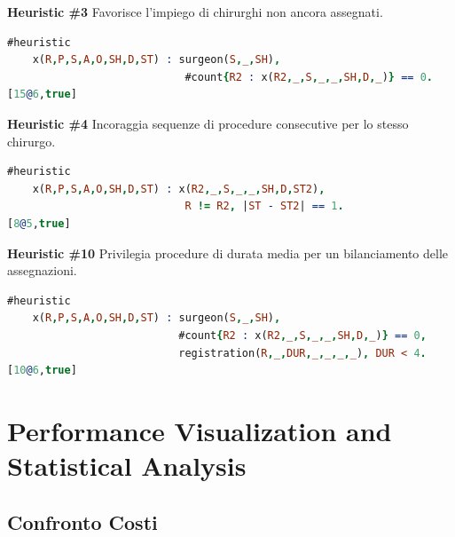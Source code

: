 \documentclass[11pt,a4paper]{article}
\begin{document}
\textbf{Heuristic \#3}
Favorisce l'impiego di chirurghi non ancora assegnati.
\begin{lstlisting}[language=Prolog]
#heuristic 
    x(R,P,S,A,O,SH,D,ST) : surgeon(S,_,SH), 
                            #count{R2 : x(R2,_,S,_,_,SH,D,_)} == 0. 
[15@6,true]
\end{lstlisting}




\textbf{Heuristic \#4}
Incoraggia sequenze di procedure consecutive per lo stesso chirurgo.
\begin{lstlisting}[language=Prolog]
#heuristic 
    x(R,P,S,A,O,SH,D,ST) : x(R2,_,S,_,_,SH,D,ST2), 
                            R != R2, |ST - ST2| == 1. 
[8@5,true]
\end{lstlisting}




\textbf{Heuristic \#10}
Privilegia procedure di durata media per un bilanciamento delle assegnazioni.
\begin{lstlisting}[language=Prolog]
#heuristic
    x(R,P,S,A,O,SH,D,ST) : surgeon(S,_,SH),
                           #count{R2 : x(R2,_,S,_,_,SH,D,_)} == 0,
                           registration(R,_,DUR,_,_,_,_), DUR < 4.
[10@6,true]
\end{lstlisting}





\section{Performance Visualization and Statistical Analysis}

\subsection{Confronto Costi}
\end{document}
